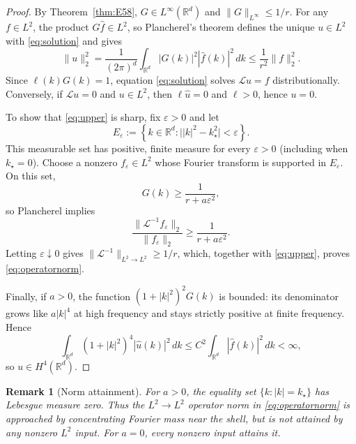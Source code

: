 \documentclass[11pt]{article}
\newtheorem{remark}{Remark}
\newcommand{\R}{\mathbb R}
\newcommand{\norm}[1]{\lVert #1\rVert}
\begin{document}
\begin{proof}
By Theorem~\ref{thm:E58}, $G\in L^\infty(\R^d)$ and
$\norm{G}_{L^\infty}\leq1/r$. For any $f\in L^2$, the product
$G\widehat f\in L^2$, so Plancherel's theorem defines the unique
$u\in L^2$ with \eqref{eq:solution} and gives
\begin{equation}\label{eq:upper}
  \norm{u}_{2}^2
  =\frac{1}{(2\pi)^d}\int_{\R^d}|G(k)|^2
   |\widehat f(k)|^2\,dk
  \leq\frac{1}{r^2}\norm{f}_2^2.
\end{equation}
Since $\ell(k)G(k)=1$, equation \eqref{eq:solution} solves
$\mathcal Lu=f$ distributionally. Conversely, if
$\mathcal Lu=0$ and $u\in L^2$, then
$\ell\widehat u=0$ and $\ell>0$, hence $u=0$.

To show that \eqref{eq:upper} is sharp, fix $\varepsilon>0$ and let
\begin{equation}
  E_\varepsilon
  :=\left\{k\in\R^d:
      \bigl||k|^2-k_\star^2\bigr|<\varepsilon\right\}.
\end{equation}
This measurable set has positive, finite measure for every
$\varepsilon>0$ (including when $k_\star=0$). Choose a nonzero
$f_\varepsilon\in L^2$ whose Fourier transform is supported in
$E_\varepsilon$. On this set,
\begin{equation}
  G(k)\geq\frac{1}{r+a\varepsilon^2},
\end{equation}
so Plancherel implies
\begin{equation}
  \frac{\norm{\mathcal L^{-1}f_\varepsilon}_2}
       {\norm{f_\varepsilon}_2}
  \geq\frac{1}{r+a\varepsilon^2}.
\end{equation}
Letting $\varepsilon\downarrow0$ gives
$\norm{\mathcal L^{-1}}_{L^2\to L^2}\geq1/r$,
which, together with \eqref{eq:upper}, proves
\eqref{eq:operatornorm}.

Finally, if $a>0$, the function
$(1+|k|^2)^2G(k)$ is bounded: its denominator grows like
$a|k|^4$ at high frequency and stays strictly positive at finite
frequency. Hence
\begin{equation}
  \int_{\R^d}(1+|k|^2)^4|\widehat u(k)|^2\,dk
  \leq C^2\int_{\R^d}|\widehat f(k)|^2\,dk<\infty,
\end{equation}
so $u\in H^4(\R^d)$.
\end{proof}

\begin{remark}[Norm attainment]
For $a>0$, the equality set $\{k:|k|=k_\star\}$ has
Lebesgue measure zero. Thus the $L^2\to L^2$ operator norm in
\eqref{eq:operatornorm} is approached by concentrating Fourier mass
near the shell, but is not attained by any nonzero $L^2$ input.
For $a=0$, every nonzero input attains it.
\end{remark}
\end{document}

